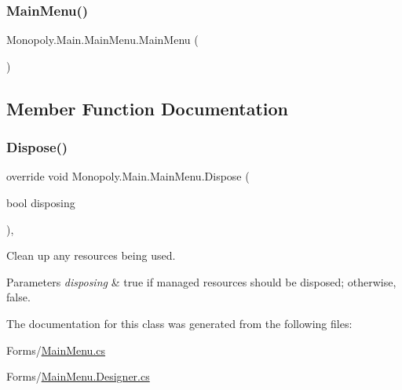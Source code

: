 \subsubsection{\texorpdfstring{Main\+Menu()}{MainMenu()}}
{\footnotesize\ttfamily Monopoly.\+Main.\+Main\+Menu.\+Main\+Menu (\begin{DoxyParamCaption}{ }\end{DoxyParamCaption})\hspace{0.3cm}{\ttfamily [inline]}}



\subsection{Member Function Documentation}
\mbox{\label{class_monopoly_1_1_main_1_1_main_menu_afc9d4151da241e7d1059c2268d20159a}} 
\subsubsection{\texorpdfstring{Dispose()}{Dispose()}}
{\footnotesize\ttfamily override void Monopoly.\+Main.\+Main\+Menu.\+Dispose (\begin{DoxyParamCaption}\item[{bool}]{disposing }\end{DoxyParamCaption})\hspace{0.3cm}{\ttfamily [inline]}, {\ttfamily [protected]}}



Clean up any resources being used. 


\begin{DoxyParams}{Parameters}
{\em disposing} & true if managed resources should be disposed; otherwise, false.\\
\hline
\end{DoxyParams}


The documentation for this class was generated from the following files\+:\begin{DoxyCompactItemize}
\item 
Forms/\mbox{\hyperlink{_main_menu_8cs}{Main\+Menu.\+cs}}\item 
Forms/\mbox{\hyperlink{_main_menu_8_designer_8cs}{Main\+Menu.\+Designer.\+cs}}\end{DoxyCompactItemize}
